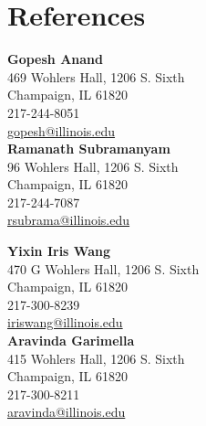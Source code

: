 
\section{\mysidestyle References}
\begin{multicols}{2}

\textbf{Gopesh Anand}\\
469 Wohlers Hall, 1206 S. Sixth\\
Champaign, IL 61820\\
217-244-8051\\
\href{mailto:gopesh@illinois.edu}{gopesh@illinois.edu}\\

\textbf{Ramanath Subramanyam}\\
96 Wohlers Hall, 1206 S. Sixth\\
Champaign, IL 61820\\
217-244-7087\\
\href{mailto:rsubrama@illinois.edu}{rsubrama@illinois.edu}\\

\end{multicols}

\begin{multicols}{2}

\textbf{Yixin Iris Wang}\\470 G Wohlers Hall, 1206 S. Sixth\\Champaign, IL 61820\\217-300-8239\\\href{mailto:iriswang@illinois.edu}{iriswang@illinois.edu}\\

\textbf{Aravinda Garimella}\\415 Wohlers Hall, 1206 S. Sixth\\Champaign, IL 61820\\217-300-8211\\\href{mailto:aravinda@illinois.edu}{aravinda@illinois.edu}\\

    \end{multicols}







